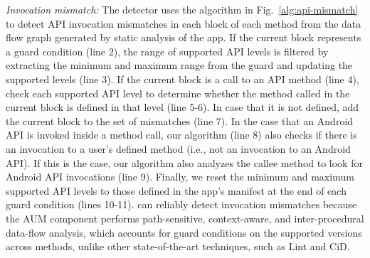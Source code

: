 \textit{Invocation mismatch:} The detector uses
the algorithm in Fig.~\ref{alg:api-mismatch} to detect API invocation
mismatches in each block of each method from the data flow
graph generated by static analysis of the app. If the
current block represents a guard condition (line 2), the
range of supported API levels is filtered by extracting the
minimum and maximum range from the guard and
updating the supported levels (line 3).
If the current block is a call to an API method (line 4),
check each supported API level to determine
whether the method called in the current block is defined in that level
(line 5-6).  In case that it is not defined, add the current
block to the set of mismatches (line 7).
%
In the case that an Android API is invoked inside a method
call, our algorithm (line 8) also checks if there is an
invocation to a user's defined method (i.e., not an
invocation to an Android API).  If this is the case, our
algorithm also analyzes the callee method  to look
for Android API invocations (line 9).
Finally, we reset the minimum and maximum supported
API levels to those defined in the app's manifest at the end
of each guard condition (lines 10-11).
%
%
%
\@approach can reliably detect invocation mismatches because
the AUM component performs path-sensitive,
context-aware, and inter-procedural data-flow analysis,
which accounts for guard conditions on the
supported versions across methods, unlike other
state-of-the-art techniques, such as {\sc Lint} and {\sc
CiD}.



\begin{figure}[t!]%
        
\end{figure}

